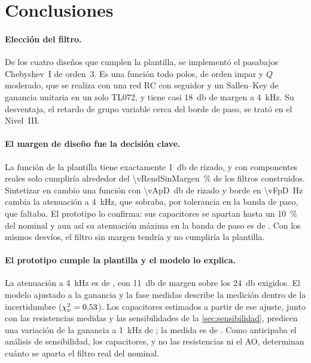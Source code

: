\section{Conclusiones}
\label{sec:conclusiones}

\paragraph{Elección del filtro.} De los cuatro diseños que cumplen la plantilla, se implementó el pasabajos Chebyshev~I de orden~3. Es una función
todo polos, de orden impar y $Q$ moderado, que se realiza con una red RC con seguidor y un Sallen--Key de ganancia unitaria en un solo TL072, y tiene
casi \qty{18}{\decibel} de margen a \qty{4}{\kilo\hertz}. Su desventaja, el retardo de grupo variable cerca del borde de paso, se trató en el
Nivel~III.

\paragraph{El margen de diseño fue la decisión clave.} La función de la plantilla tiene exactamente \qty{1}{\decibel} de rizado, y con componentes
reales solo cumpliría alrededor del \qty{\vRendSinMargen}{\percent} de los filtros construidos. Sintetizar en cambio una función con
\qty{\vApD}{\decibel} de rizado y borde en \qty{\vFpD}{\hertz} cambia la atenuación a \qty{4}{\kilo\hertz}, que sobraba, por tolerancia en la banda
de paso, que faltaba. El prototipo lo confirma: sus capacitores se apartan hasta un \qty{10}{\percent} del nominal y aun así su atenuación máxima en
la banda de paso es de . Con los mismos desvíos, el filtro sin margen tendría  y no
cumpliría la plantilla.

\paragraph{El prototipo cumple la plantilla y el modelo lo explica.} La atenuación a \qty{4}{\kilo\hertz} es de ,
con \qty{11}{\decibel} de margen sobre los \qty{24}{\decibel} exigidos. El modelo ajustado a la ganancia y la fase medidas describe la medición
dentro de la incertidumbre ($\chi^2_\nu = \nr{2}{\mChiCuadRed}$). Los capacitores estimados a partir de ese ajuste, junto con las resistencias
medidas y las sensibilidades de la \cref{sec:sensibilidad}, predicen una variación de la ganancia a \qty{1}{\kilo\hertz} de
; la medida es de . Como anticipaba el análisis de sensibilidad, los capacitores, y no
las resistencias ni el AO, determinan cuánto se aparta el filtro real del nominal.

